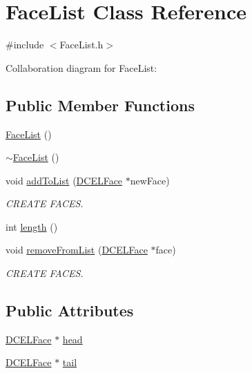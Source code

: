 \hypertarget{classFaceList}{}\section{Face\+List Class Reference}
\label{classFaceList}


{\ttfamily \#include $<$Face\+List.\+h$>$}



Collaboration diagram for Face\+List\+:
\subsection*{Public Member Functions}
\begin{DoxyCompactItemize}
\item 
\hyperlink{classFaceList_aaa982d0bd3d395436e8b8ef05b5232be}{Face\+List} ()
\item 
\hyperlink{classFaceList_a9bb9c3d2b32b53315d8aa7280240bbb2}{$\sim$\+Face\+List} ()
\item 
void \hyperlink{classFaceList_ad49cedf6161dc63e440137538baf6179}{add\+To\+List} (\hyperlink{classDCELFace}{D\+C\+E\+L\+Face} $\ast$new\+Face)
\begin{DoxyCompactList}\small\item\em C\+R\+E\+A\+TE F\+A\+C\+ES. \end{DoxyCompactList}\item 
int \hyperlink{classFaceList_a172e8236b2c75a3000a5634240255243}{length} ()
\item 
void \hyperlink{classFaceList_ac5587f632433d76be2b9e8ae038cdd4f}{remove\+From\+List} (\hyperlink{classDCELFace}{D\+C\+E\+L\+Face} $\ast$face)
\begin{DoxyCompactList}\small\item\em C\+R\+E\+A\+TE F\+A\+C\+ES. \end{DoxyCompactList}\end{DoxyCompactItemize}
\subsection*{Public Attributes}
\begin{DoxyCompactItemize}
\item 
\hyperlink{classDCELFace}{D\+C\+E\+L\+Face} $\ast$ \hyperlink{classFaceList_a9dadb4bb9779d0869c725b90c9f33205}{head}
\item 
\hyperlink{classDCELFace}{D\+C\+E\+L\+Face} $\ast$ \hyperlink{classFaceList_a013acfbf783cd5b9a036981a8c747f7d}{tail}
\end{DoxyCompactItemize}


